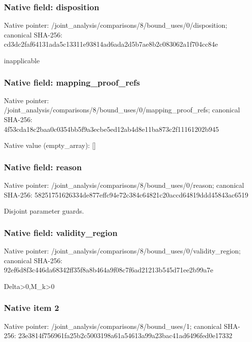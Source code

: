 \documentclass[10pt,a4paper]{article}
\begin{document}
\subsubsection{Native field: disposition}
Native pointer: /joint\_\allowbreak{}analysis/comparisons/8/bound\_\allowbreak{}uses/0/disposition; canonical SHA-256: cd3dc2faf64131ada5c13311e93814ad6ada2d5b7ae8b2c083062a1f704cc84e

\begingroup\raggedright\sloppy inapplicable\par\endgroup

\subsubsection{Native field: mapping\_\allowbreak{}proof\_\allowbreak{}refs}
Native pointer: /joint\_\allowbreak{}analysis/comparisons/8/bound\_\allowbreak{}uses/0/mapping\_\allowbreak{}proof\_\allowbreak{}refs; canonical SHA-256: 4f53cda18c2baa0c0354bb5f9a3ecbe5ed12ab4d8e11ba873c2f11161202b945

Native value (empty\_\allowbreak{}array): []

\subsubsection{Native field: reason}
Native pointer: /joint\_\allowbreak{}analysis/comparisons/8/bound\_\allowbreak{}uses/0/reason; canonical SHA-256: 58251751626334de877effc94e72c384c64821c20accd64819ddd45843ac6519

\begingroup\raggedright\sloppy Disjoint parameter guards.\par\endgroup

\subsubsection{Native field: validity\_\allowbreak{}region}
Native pointer: /joint\_\allowbreak{}analysis/comparisons/8/bound\_\allowbreak{}uses/0/validity\_\allowbreak{}region; canonical SHA-256: 92ef6d8f3c446da68342ff35f8a8b464a9f08c7f6ad21213b545d71ee2b99a7e

\begingroup\raggedright\sloppy Delta>0,\allowbreak{}M\_\allowbreak{}k>0\par\endgroup

\subsubsection{Native item 2}
Native pointer: /joint\_\allowbreak{}analysis/comparisons/8/bound\_\allowbreak{}uses/1; canonical SHA-256: 23e3814f756961fa25b2c5003198a61a54613a99a23bac41ad6496fed0e17332
\end{document}

